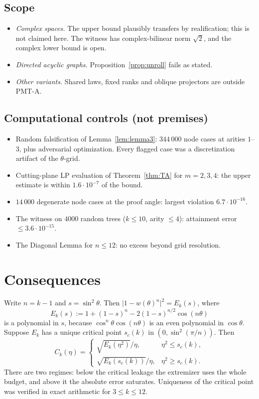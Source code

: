 \documentclass[11pt]{amsart}
\theoremstyle{definition}
\newcommand{\abs}[1]{\lvert #1\rvert}
\newcommand{\PMTA}{\textsf{PMT-A}}
\begin{document}
\subsection*{Scope}
\begin{itemize}
\item \emph{Complex spaces.} The upper bound plausibly transfers by realification;
  this is not claimed here. The witness has complex-bilinear norm $\sqrt2$, and the
  complex lower bound is open.
\item \emph{Directed acyclic graphs.} Proposition~\ref{prop:unroll} fails as stated.
\item \emph{Other variants.} Shared laws, fixed ranks and oblique projectors are
  outside \PMTA.
\end{itemize}

\subsection*{Computational controls (not premises)}
\begin{itemize}
\item Random falsification of Lemma~\ref{lem:lemma3}: $344\,000$ node cases at
  arities $1$--$3$, plus adversarial optimization. Every flagged case was a
  discretization artifact of the $\theta$-grid.
\item Cutting-plane LP evaluation of Theorem~\ref{thm:TA} for $m=2,3,4$: the upper
  estimate is within $1.6\cdot10^{-7}$ of the bound.
\item $14\,000$ degenerate node cases at the proof angle: largest violation
  $6.7\cdot10^{-16}$.
\item The witness on $4000$ random trees ($k\le10$, arity $\le4$): attainment error
  $\le3.6\cdot10^{-15}$.
\item The Diagonal Lemma for $n\le12$: no excess beyond grid resolution.
\end{itemize}

\section{Consequences}\label{sec:consequences}

Write $n=k-1$ and $s=\sin^2\theta$. Then $\abs{1-w(\theta)^n}^2=E_k(s)$, where
\[
E_k(s):=1+(1-s)^n-2(1-s)^{n/2}\cos(n\theta)
\]
is a polynomial in $s$, because $\cos^n\theta\cos(n\theta)$ is an even polynomial in
$\cos\theta$. Suppose $E_k$ has a unique critical point $s_c(k)$ in
$(0,\sin^2(\pi/n))$. Then
\[
C_k(\eta)=\begin{cases}\sqrt{E_k(\eta^2)}/\eta,& \eta^2\le s_c(k),\\ \sqrt{E_k(s_c(k))}/\eta,&\eta^2\ge s_c(k).\end{cases}
\]
There are two regimes: below the critical leakage the extremizer uses the whole
budget, and above it the absolute error saturates. Uniqueness of the critical point
was verified in exact arithmetic for $3\le k\le12$.
\end{document}
